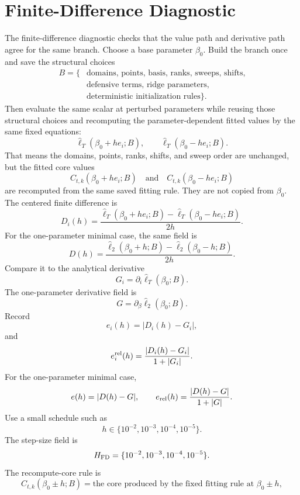 \documentclass[11pt]{article}
\newcommand{\widehatell}{\widehat\ell}
\begin{document}
\section{Finite-Difference Diagnostic}

The finite-difference diagnostic checks that the value path and derivative path agree
for the same branch.  Choose a base parameter \(\beta_0\).  Build the branch
once and save the structural choices
\[
    \begin{aligned}
    B=\{&
    \text{domains, points, basis, ranks, sweeps, shifts,}\\
    &\text{defensive terms, ridge parameters,}\\
    &\text{deterministic initialization rules}\}.
    \end{aligned}
    \label{eq:p24-p19-94}
\]
Then evaluate the same scalar at perturbed parameters while reusing those
structural choices and recomputing the parameter-dependent fitted values by the
same fixed equations:
\[
    \widehatell_T(\beta_0+h e_i;B),
    \qquad
    \widehatell_T(\beta_0-h e_i;B).
    \label{eq:p24-p19-95}
\]
That means the domains, points, ranks, shifts, and sweep order are unchanged,
but the fitted core values
\[
    C_{t,k}(\beta_0+h e_i;B)
    \quad\text{and}\quad
    C_{t,k}(\beta_0-h e_i;B)
    \label{eq:p24-p19-95a}
\]
are recomputed from the same saved fitting rule.  They are not copied from
\(\beta_0\).
The centered finite difference is
\[
    D_i(h)
    =
    \frac{
    \widehatell_T(\beta_0+h e_i;B)
    -
    \widehatell_T(\beta_0-h e_i;B)}
    {2h}.
    \label{eq:p24-p19-96}
\]
For the one-parameter minimal case, the same field is
\[
    D(h)
    =
    \frac{
    \widehatell_2(\beta_0+h;B)
    -
    \widehatell_2(\beta_0-h;B)}
    {2h}.
    \label{eq:p24-p22-fd0a}
\]
Compare it to the analytical derivative
\[
    G_i=\partial_i\widehatell_T(\beta_0;B).
    \label{eq:p24-p19-97}
\]
The one-parameter derivative field is
\[
    G=\partial_\beta\widehatell_2(\beta_0;B).
    \label{eq:p24-p22-fd0b}
\]
Record
\[
    e_i(h)=|D_i(h)-G_i|,
    \label{eq:p24-p19-98}
\]
and
\[
    e_i^{\rm rel}(h)
    =
    \frac{|D_i(h)-G_i|}{1+|G_i|}.
    \label{eq:p24-p19-99}
\]
For the one-parameter minimal case,
\[
    e(h)=|D(h)-G|,
    \qquad
    e_{\rm rel}(h)=\frac{|D(h)-G|}{1+|G|}.
    \label{eq:p24-p22-fd0c}
\]
Use a small schedule such as
\[
    h\in\{10^{-2},10^{-3},10^{-4},10^{-5}\}.
    \label{eq:p24-p19-100}
\]
The step-size field is
\[
    H_{\rm FD}=\{10^{-2},10^{-3},10^{-4},10^{-5}\}.
    \label{eq:p24-p22-fd0d}
\]
The recompute-core rule is
\[
    C_{t,k}(\beta_0\pm h;B)
    =
    \text{the core produced by the fixed fitting rule at }\beta_0\pm h,
    \label{eq:p24-p22-fd0e}
\]
\end{document}
